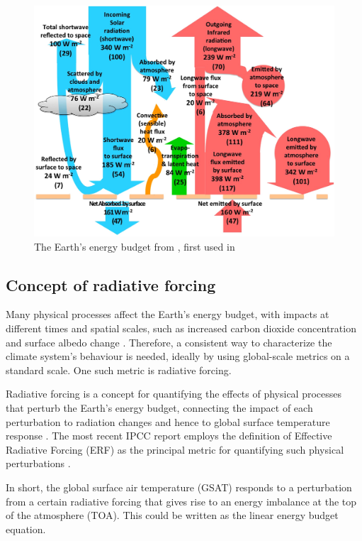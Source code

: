 \begin{figure}
    \centering
    \includegraphics[width=0.7\columnwidth]{Chapter1/figs/01_trenberth.jpg}
    \caption[The Earth’s energy budget]{The Earth’s energy budget from \citet{readGlobalEnergyBudgets2016}, first used in \citet{kiehlEarthAnnualGlobal1997}}
    \label{fig:trenberth}
\end{figure}




\subsection{Concept of radiative forcing}
Many physical processes affect the Earth's energy budget, with impacts at different times and spatial scales, such as increased carbon dioxide concentration and surface albedo change \citep{forsterEarthEnergyBudget2021}. Therefore, a consistent way to characterize the climate system's behaviour is needed, ideally by using global-scale metrics on a standard scale. One such metric is radiative forcing.

Radiative forcing is a concept for quantifying the effects of physical processes that perturb the Earth's energy budget, connecting the impact of each perturbation to radiation changes and hence to global surface temperature response \citep{thornhillEffectiveRadiativeForcing2021}. The most recent IPCC report employs the definition of Effective Radiative Forcing (ERF) as the principal metric for quantifying such physical perturbations \citep{forsterEarthEnergyBudget2021}. 

In short, the global surface air temperature (GSAT) responds to a perturbation from a certain radiative forcing that gives rise to an energy imbalance at the top of the atmosphere (TOA). This could be written as the linear energy budget equation.

